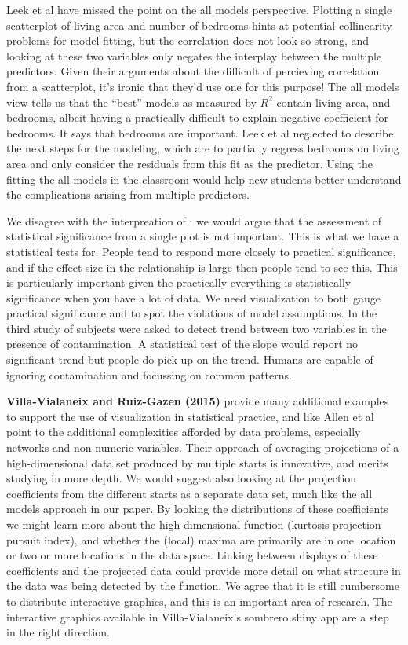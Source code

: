 \documentclass[preprint]{imsart}
\begin{document}
Leek et al have missed the point on the all models perspective. Plotting a single scatterplot of living area and number of bedrooms hints at potential collinearity problems for model fitting, but the correlation does not look so strong, and looking at these two variables only negates the interplay between the multiple predictors. Given their arguments about the difficult of percieving correlation from a scatterplot, it's ironic that they'd use one for this purpose! The all models view tells us that the ``best'' models as measured by $R^2$ contain living area, and bedrooms, albeit having a practically difficult to explain negative coefficient for bedrooms. It says that bedrooms are important. Leek et al neglected to describe the next steps for the modeling, which are to partially regress bedrooms on living area and only consider the residuals from this fit as the predictor. Using the fitting the all models in the classroom would help new students better understand the complications arising from multiple predictors.

We disagree with the interpreation of \cite{Fisher}: we would argue that the assessment of statistical significance from a single plot is not important. This is what we have a statistical tests for. People tend to respond more closely to practical significance, and if the effect size in the relationship is large then people tend to see this. This is particularly important given the practically everything is statistically significance when you have a lot of data. We need visualization to both gauge practical significance and to spot the violations of model assumptions. In the third study of \cite{majumder:2013} subjects were asked to detect trend between two variables in the presence of contamination. A statistical test of the slope would report no significant trend but people do pick up on the trend. Humans are capable of ignoring contamination and focussing on common patterns.


\textbf{Villa-Vialaneix and Ruiz-Gazen (2015)} provide many additional examples to support the use of visualization in statistical practice, and like Allen et al point to the additional complexities afforded by data problems, especially networks and non-numeric variables. Their approach of averaging projections of a high-dimensional data set produced by multiple starts is innovative, and merits studying in more depth. We would suggest also looking at the projection coefficients from the different starts as a separate data set, much like the all models approach in our paper. By looking the distributions of these coefficients we might learn more about the high-dimensional function (kurtosis projection pursuit index), and whether the (local) maxima are primarily are in one location or two or more locations in the data space. Linking between displays of these coefficients and the projected data could provide more detail on what structure in the data was being detected by the function. We agree that it is still cumbersome to distribute interactive graphics, and this is an important area of research. The interactive graphics available in Villa-Vialaneix's sombrero shiny app are a step in the right direction.
\end{document}
